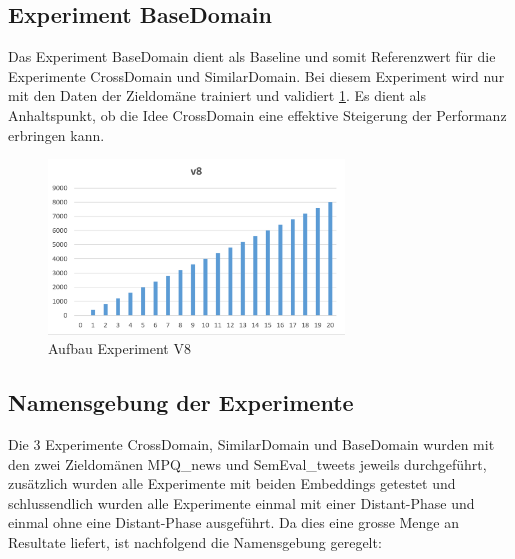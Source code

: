 \subsection{Experiment BaseDomain}
\label{methods:v8}
Das Experiment BaseDomain dient als Baseline und somit Referenzwert für die Experimente CrossDomain und SimilarDomain.
Bei diesem Experiment wird nur mit den Daten der Zieldomäne trainiert und validiert \ref{fig:Method_V8}. Es dient als Anhaltspunkt, ob die Idee CrossDomain eine effektive  Steigerung der Performanz erbringen kann.
\begin{figure}[H]
	\centering
	\includegraphics[width=0.7\textwidth]{img/Method_V8}
	\caption{Aufbau Experiment V8}
	\label{fig:Method_V8}
\end{figure}
\subsection{Namensgebung der Experimente}
Die 3 Experimente CrossDomain, SimilarDomain und BaseDomain wurden mit den zwei Zieldomänen MPQ\_news und SemEval\_tweets jeweils durchgeführt, zusätzlich wurden alle Experimente mit beiden Embeddings getestet und schlussendlich wurden alle Experimente einmal mit einer Distant-Phase und einmal ohne eine Distant-Phase ausgeführt. Da dies eine grosse Menge an Resultate liefert, ist nachfolgend die Namensgebung geregelt:

